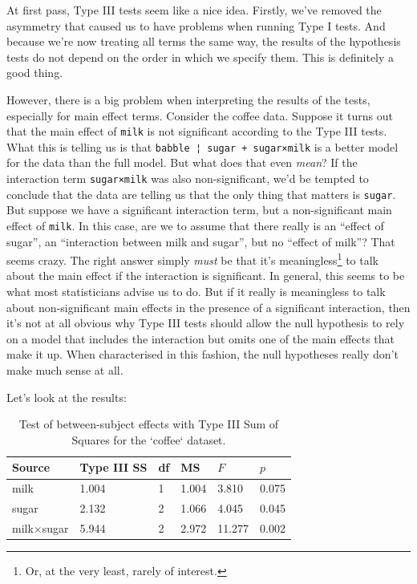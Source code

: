 \documentclass[
  11pt,
  a4paper,
  twoside,symmetric,openright]{book}
\theoremstyle{break}
\theoremstyle{break}
\begin{document}
At first pass, Type III tests seem like a nice idea. Firstly, we've removed the asymmetry that caused us to have problems when running Type I tests. And because we're now treating all terms the same way, the results of the hypothesis tests do not depend on the order in which we specify them. This is definitely a good thing.

However, there is a big problem when interpreting the results of the tests, especially for main effect terms. Consider the coffee data. Suppose it turns out that the main effect of \texttt{milk} is not significant according to the Type III tests. What this is telling us is that \texttt{babble\ ¦\ sugar\ +\ sugar×milk} is a better model for the data than the full model. But what does that even \emph{mean}? If the interaction term \texttt{sugar×milk} was also non-significant, we'd be tempted to conclude that the data are telling us that the only thing that matters is \texttt{sugar}. But suppose we have a significant interaction term, but a non-significant main effect of \texttt{milk}. In this case, are we to assume that there really is an ``effect of sugar'', an ``interaction between milk and sugar'', but no ``effect of milk''? That seems crazy. The right answer simply \emph{must} be that it's meaningless\footnote{Or, at the very least, rarely of interest.} to talk about the main effect if the interaction is significant. In general, this seems to be what most statisticians advise us to do. But if it really is meaningless to talk about non-significant main effects in the presence of a significant interaction, then it's not at all obvious why Type III tests should allow the null hypothesis to rely on a model that includes the interaction but omits one of the main effects that make it up. When characterised in this fashion, the null hypotheses really don't make much sense at all.

Let's look at the results:

\begin{table}[!h]

\caption{\label{tab:unnamed-chunk-97}Test of between-subject effects with Type III Sum of Squares for the `coffee` dataset.}
\centering
\begin{tabular}[t]{llllll}
\toprule
Source & Type III SS & df & MS & $F$ & $p$\\
\midrule
milk & 1.004 & 1 & 1.004 & 3.810 & 0.075\\
sugar & 2.132 & 2 & 1.066 & 4.045 & 0.045\\
milk×sugar & 5.944 & 2 & 2.972 & 11.277 & 0.002\\
\bottomrule
\end{tabular}
\end{table}
\end{document}
